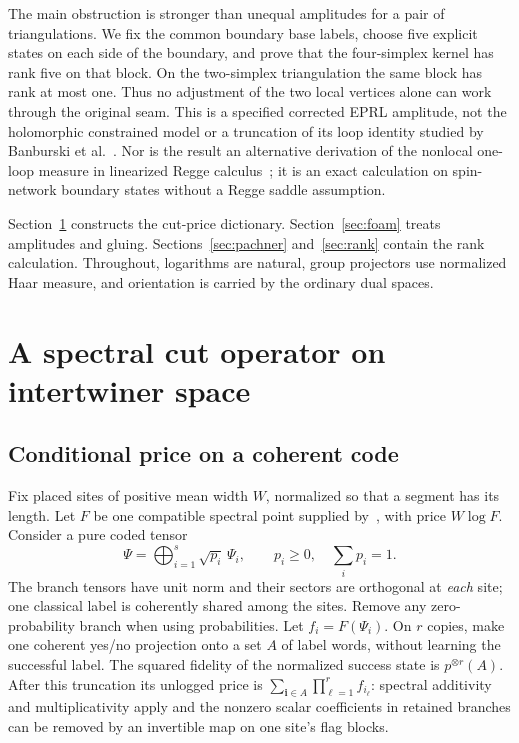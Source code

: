 \documentclass[11pt]{article}
\theoremstyle{remark}
\begin{document}
The main obstruction is stronger than unequal amplitudes for a pair of triangulations. We fix the common boundary base labels, choose five explicit states on each side of the boundary, and prove that the four-simplex kernel has rank five on that block. On the two-simplex triangulation the same block has rank at most one. Thus no adjustment of the two local vertices alone can work through the original seam. This is a specified corrected EPRL amplitude, not the holomorphic constrained model or a truncation of its loop identity studied by Banburski et al.~\cite{Holomorphic}. Nor is the result an alternative derivation of the nonlocal one-loop measure in linearized Regge calculus~\cite{Nonlocal}; it is an exact calculation on spin-network boundary states without a Regge saddle assumption.

Section~\ref{sec:dictionary} constructs the cut-price dictionary. Section~\ref{sec:foam} treats amplitudes and gluing. Sections~\ref{sec:pachner} and~\ref{sec:rank} contain the rank calculation. Throughout, logarithms are natural, group projectors use normalized Haar measure, and orientation is carried by the ordinary dual spaces.

\section{A spectral cut operator on intertwiner space}\label{sec:dictionary}

\subsection{Conditional price on a coherent code}

Fix placed sites of positive mean width \(W\), normalized so that a segment has its length. Let \(F\) be one compatible spectral point supplied by~\cite{OpenAI}, with price \(W\log F\). Consider a pure coded tensor
\[
 \Psi=\bigoplus_{i=1}^s \sqrt{p_i}\,\Psi_i,\qquad
 p_i\geq 0,\quad \sum_i p_i=1.
\]
The branch tensors have unit norm and their sectors are orthogonal at \emph{each} site; one classical label is coherently shared among the sites. Remove any zero-probability branch when using probabilities. Let \(f_i=F(\Psi_i)\). On \(r\) copies, make one coherent yes/no projection onto a set \(A\) of label words, without learning the successful label. The squared fidelity of the normalized success state is \(p^{\otimes r}(A)\). After this truncation its unlogged price is \(\sum_{\boldsymbol i\in A}\prod_{\ell=1}^r f_{i_\ell}\): spectral additivity and multiplicativity apply and the nonzero scalar coefficients in retained branches can be removed by an invertible map on one site's flag blocks.
\end{document}
